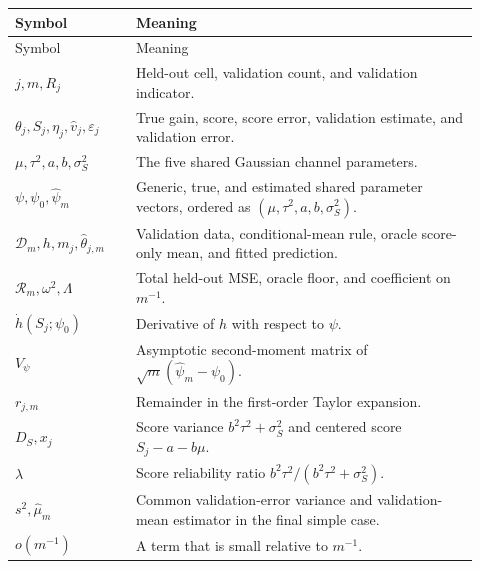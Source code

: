 \documentclass[11pt]{article}
\begin{document}
\begin{longtable}{>{\raggedright\arraybackslash}p{0.24\linewidth}
                  >{\raggedright\arraybackslash}p{0.68\linewidth}}
\hline
Symbol & Meaning \\
\hline
\endfirsthead
\hline
Symbol & Meaning \\
\hline
\endhead
\(j,m,R_j\) & Held-out cell, validation count, and validation indicator. \\
\(\theta_j,S_j,\eta_j,\widehat v_j,\varepsilon_j\) & True gain, score,
score error, validation estimate, and validation error. \\
\(\mu,\tau^2,a,b,\sigma_S^2\) & The five shared Gaussian channel
parameters. \\
\(\psi,\psi_0,\widehat\psi_m\) & Generic, true, and estimated shared
parameter vectors, ordered as \((\mu,\tau^2,a,b,\sigma_S^2)\). \\
\(\mathcal D_m,h,m_j,\widehat\theta_{j,m}\) & Validation data,
conditional-mean rule, oracle score-only mean, and fitted prediction. \\
\(\mathcal R_m,\omega^2,\Lambda\) & Total held-out MSE, oracle floor, and
coefficient on \(m^{-1}\). \\
\(\dot h(S_j;\psi_0)\) & Derivative of \(h\) with respect to \(\psi\). \\
\(V_\psi\) & Asymptotic second-moment matrix of
\(\sqrt m(\widehat\psi_m-\psi_0)\). \\
\(r_{j,m}\) & Remainder in the first-order Taylor expansion. \\
\(D_S,x_j\) & Score variance \(b^2\tau^2+\sigma_S^2\) and centered score
\(S_j-a-b\mu\). \\
\(\lambda\) & Score reliability ratio
\(b^2\tau^2/(b^2\tau^2+\sigma_S^2)\). \\
\(s^2,\widehat\mu_m\) & Common validation-error variance and validation-mean
estimator in the final simple case. \\
\(o(m^{-1})\) & A term that is small relative to \(m^{-1}\). \\
\hline
\end{longtable}
\end{document}
